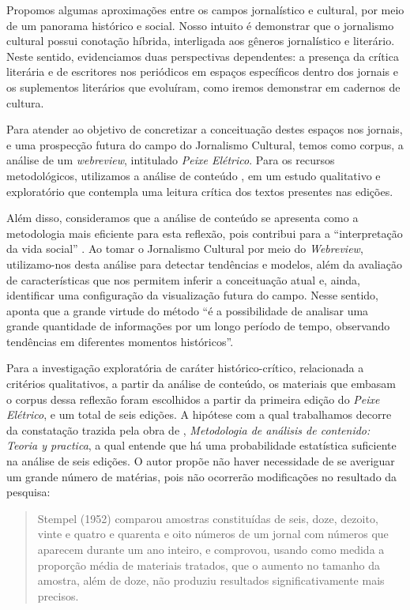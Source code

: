 \documentclass[portuguese]{textolivre}
\begin{document}
Propomos algumas aproximações entre os campos jornalístico e cultural, por meio de um panorama histórico e social. Nosso intuito é demonstrar que o jornalismo cultural possui conotação híbrida, interligada aos gêneros jornalístico e literário. Neste sentido, evidenciamos duas perspectivas dependentes: a presença da crítica literária e de escritores nos periódicos em espaços específicos dentro dos jornais e os suplementos literários que evoluíram, como iremos demonstrar em cadernos de cultura.

Para atender ao objetivo de concretizar a conceituação destes espaços nos jornais, e uma prospecção futura do campo do Jornalismo Cultural, temos como corpus, a análise de um \textit{webreview}, intitulado \textit{Peixe Elétrico}. Para os recursos metodológicos, utilizamos a análise de conteúdo \cite{gil1989,bardin1977}, em um estudo qualitativo e exploratório \cite[p. 28]{freitas2002} que contempla uma leitura crítica dos textos presentes nas edições.

Além disso, consideramos que a análise de conteúdo se apresenta como a metodologia mais eficiente para esta reflexão, pois contribui para a “interpretação da vida social” \cite[p. 123]{herscovitz2007analise}. Ao tomar o Jornalismo Cultural por meio do \textit{Webreview}, utilizamo-nos desta análise para detectar tendências e modelos, além da avaliação de características que nos permitem inferir a conceituação atual e, ainda, identificar uma configuração da visualização futura do campo. Nesse sentido, \textcite[p. 139]{herscovitz2012} aponta que a grande virtude do método “é a possibilidade de analisar uma grande quantidade de informações por um longo período de tempo, observando tendências em diferentes momentos históricos”.

Para a investigação exploratória de caráter histórico-crítico, relacionada a critérios qualitativos, a partir da análise de conteúdo, os materiais que embasam o corpus dessa reflexão foram escolhidos a partir da primeira edição do \textit{Peixe Elétrico}, e um total de seis edições. A hipótese com a qual trabalhamos decorre da constatação trazida pela obra de \textcite{krippendorff1990}, \textit{Metodologia de análisis de contenido: Teoria y practica}, a qual entende que há uma probabilidade estatística suficiente na análise de seis edições. O autor propõe não haver necessidade de se averiguar um grande número de matérias, pois não ocorrerão modificações no resultado da pesquisa:

\begin{quote}
    Stempel (1952) comparou amostras constituídas de seis, doze, dezoito, vinte e quatro e quarenta e oito números de um jornal com números que aparecem durante um ano inteiro, e comprovou, usando como medida a proporção média de materiais tratados, que o aumento no tamanho da amostra, além de doze, não produziu resultados significativamente mais precisos.
\end{quote}
\end{document}
